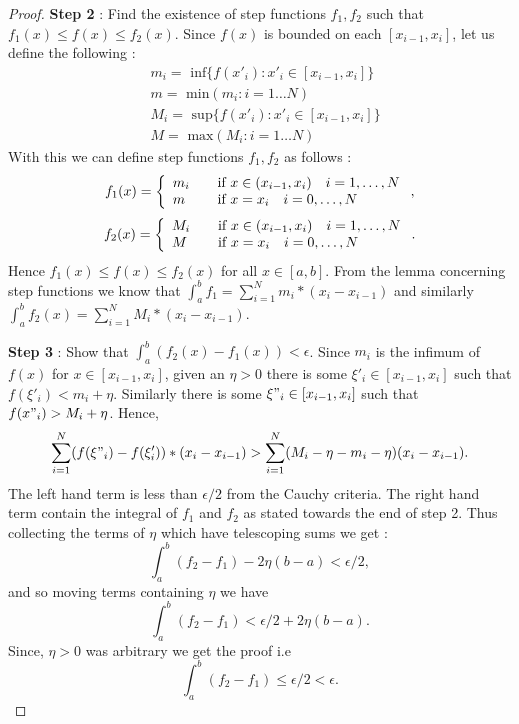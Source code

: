 \begin{proof}
\textbf{Step 2} : Find the existence of step functions $f_1,f_2$ such that $f_1(x) \leq f(x) \leq 
f_2(x)$.
Since $f(x)$ is bounded on each $\left[x_{i-1},x_{i}\right]$, let us define the following :
\begin{displaymath}
    \begin{aligned}
	&m_i = \text{ inf}\lbrace f(x'_i) : x'_i \in \left[x_{i-1},x_i\right]\rbrace \\
	&m = \text{ min}(m_i : i = 1 \dots N) \\
	&M_i = \text{ sup}\lbrace f(x'_i) : x'_i \in \left[x_{i-1},x_i\right]\rbrace \\
	&M = \text{ max}(M_i : i = 1 \dots N)
    \end{aligned}
\end{displaymath}
With this we can define step functions $f_1,f_2$ as follows : 
    \[ f_{1}(x) = \left\{ 
	    \begin{array}{l l}
		m_i & \quad \text{if } x \in (x_{i-1},x_i) \quad i = 1,\dots,N \\
		m & \quad \text{if } x = x_i \quad i = 0,\dots,N 
	    \end{array} \right. ,\]
    \[ f_{2}(x) = \left\{ 
	    \begin{array}{l l}
		M_i & \quad \text{if } x \in (x_{i-1},x_i) \quad i = 1,\dots,N \\
		M & \quad \text{if } x = x_i \quad i = 0,\dots,N 
	    \end{array} \right. .\]
    Hence $f_1(x) \leq f(x) \leq f_2(x)$ for all $x \in \left[a,b\right]$. From the lemma concerning
    step functions we know that $\int_a^b f_1 = \sum_{i = 1}^N m_i*(x_i - x_{i-1})$ and similarly
    $\int_a^b f_2(x) = \sum_{i = 1}^N M_i*(x_i - x_{i-1})$.

\textbf{Step 3} : Show that $\int_a^b (f_2(x) - f_1(x)) < \epsilon$.
Since $m_i$ is the infimum of $f(x)$ for $x \in \left[x_{i-1},x_i\right]$, given an $\eta > 0$ there
is some $\xi'_i \in \left[x_{i-1},x_i\right]$ such that $f(\xi'_i) < m_i + \eta$. Similarly there is
some $\xi"_i \in \left[x_{i-1},x_i\right]$ such that $f(x"_i) > M_i + \eta$. Hence, 
\[ \sum_{i = 1}^{N}(f(\xi"_i) - f(\xi'_i))*(x_i - x_{i-1}) > \sum_{i = 1}^{N}(M_i - \eta - m_i -
    \eta)(x_i - x_{i-1}) .\]
The left hand term is less than $\epsilon/2$ from the Cauchy criteria. The right hand term contain
the integral of $f_1$ and $f_2$ as stated towards the end of step 2. Thus collecting the terms of
$\eta$ which have telescoping sums we get :
\[ \int_a^b (f_2 - f_1) -2\eta(b-a) < \epsilon /2 ,\] and so moving terms containing $\eta$ we have
\[ \int_a^b (f_2 - f_1) < \epsilon/2 + 2\eta(b-a) .\] Since, $\eta > 0 $ was arbitrary we get the
proof i.e 
\[ \int_a^b (f_2 - f_1) \leq \epsilon/2 < \epsilon .\]


\end{proof}
